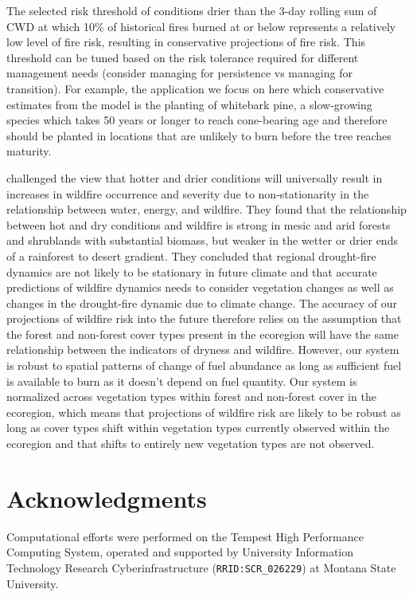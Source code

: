 \documentclass[11p]{article}
\begin{document}
The selected risk threshold of conditions drier than the 3-day rolling sum of CWD at which 10\% of historical fires burned at or below represents a relatively low level of fire risk, resulting in conservative projections of fire risk. This threshold can be tuned based on the risk tolerance required for different management needs (consider managing for persistence vs managing for transition). For example, the application we focus on here which conservative estimates from the model is the planting of whitebark pine, a slow-growing species which takes 50 years or longer to reach cone-bearing age \citep{tombackWhitebarkPineCommunities2001} and therefore should be planted in locations that are unlikely to burn before the tree reaches maturity.

\citet{mckenzieClimateChangeEcohydrology2017} challenged the view that hotter and drier conditions will universally result in increases in wildfire occurrence and severity due to non-stationarity in the relationship between water, energy, and wildfire. They found that the relationship between hot and dry conditions and wildfire is strong in mesic and arid forests and shrublands with substantial biomass, but weaker in the wetter or drier ends of a rainforest to desert gradient. They concluded that regional drought-fire dynamics are not likely to be stationary in future climate and that accurate predictions of wildfire dynamics needs to consider vegetation changes  as well as changes in the drought-fire dynamic due to climate change. The accuracy of our projections of wildfire risk into the future therefore relies on the assumption that the forest and non-forest cover types present in the ecoregion will have the same relationship between the indicators of dryness and wildfire. However, our system is robust to spatial patterns of change of fuel abundance as long as sufficient fuel is available to burn as it doesn't depend on fuel quantity. Our system is normalized across vegetation types within forest and non-forest cover in the ecoregion, which means that projections of wildfire risk are likely to be robust as long as cover types shift within vegetation types currently observed within the ecoregion and that shifts to entirely new vegetation types are not observed.




\section{Acknowledgments}

Computational efforts were performed on the Tempest High Performance Computing System, operated and supported by University Information Technology Research Cyberinfrastructure (\texttt{RRID:SCR\_026229}) at Montana State University.

\clearpage

\printbibliography[
heading=bibintoc,
title={References}
]
\end{document}
